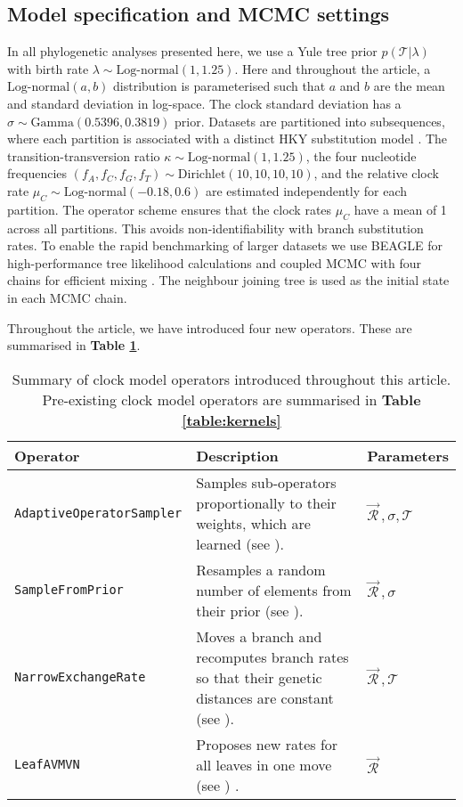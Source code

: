 \documentclass[10pt,letterpaper]{article}
\begin{document}
\clearpage
\subsection*{Model specification and MCMC settings} \label{sect:methods}

In all phylogenetic analyses presented here, we use a Yule \cite{yule1925ii} tree prior $p(\mathcal{T}|\lambda)$ with birth rate $\lambda \sim \text{Log-normal}(1,1.25)$.
Here and throughout the article, a $\text{Log-normal}(a,b)$ distribution is parameterised such that $a$ and $b$ are the mean and standard deviation in log-space.
The clock standard deviation has a $\sigma \sim \text{Gamma}(0.5396,0.3819)$ prior.
Datasets are partitioned into subsequences, where each partition is associated with a distinct HKY substitution model \cite{hasegawa1985dating}.
The transition-transversion ratio $\kappa \sim \text{Log-normal}(1, 1.25)$, the four nucleotide frequencies $(f_A, f_C, f_G, f_T) \sim \text{Dirichlet}(10,10,10,10)$, and the relative clock rate $\mu_C \sim \text{Log-normal}(-0.18, 0.6)$ are estimated independently for each partition.
The operator scheme ensures that the clock rates $\mu_C$ have a mean of 1 across all partitions. 
This avoids non-identifiability with branch substitution rates.
To enable the rapid benchmarking of larger datasets we use BEAGLE for high-performance tree likelihood calculations \cite{ayres2012beagle} and coupled MCMC with four chains for efficient mixing \cite{muller2019coupled}.
The neighbour joining tree \cite{saitou1987neighbor} is used as the initial state in each MCMC chain.



Throughout the article, we have introduced four new operators. 
These are summarised in \textbf{Table \ref{table:newOperators}}.


\begin{table}[h!]
\centering
\begin{tabular}{l p{4cm} l} 
 Operator & Description & Parameters  \\
  \hline
 \texttt{AdaptiveOperatorSampler} & Samples sub-operators proportionally to their weights, which are learned (see \nameref{sect:adaptiveSampling}). & $\vec{\mathcal{R}}^{\,}, \sigma, \mathcal{T}$ \\
  \hline
 \texttt{SampleFromPrior} & Resamples a random number of elements from their prior (see \nameref{sect:adaptiveSampling}). & $\vec{\mathcal{R}}^{\,}, \sigma$ \\
  \hline
 \texttt{NarrowExchangeRate} & Moves a branch and recomputes branch rates so that their genetic distances are constant (see \nameref{sect:NER}). & $\vec{\mathcal{R}}^{\,}, \mathcal{T}$\\
  \hline
 \texttt{LeafAVMVN}  & Proposes new rates for all leaves in one move (see \nameref{AVMVN_sect}) \cite{baele2017adaptive}. & $\vec{\mathcal{R}}^{\,}$ \\
\end{tabular}
\caption{Summary of clock model operators introduced throughout this article. Pre-existing clock model operators are summarised in \textbf{Table \ref{table:kernels}}}
\label{table:newOperators}
\end{table}
\end{document}
